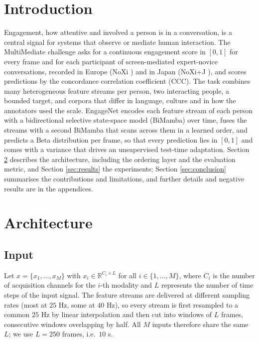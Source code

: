 \documentclass[10pt,a4paper,twocolumn]{article}
\newcommand{\R}{\mathbb{R}}
\begin{document}
	\section{Introduction}
	\label{sec:intro}
	Engagement, how attentive and involved a person is in a conversation, is a central signal for systems that observe or mediate human interaction. The MultiMediate challenge \cite{withanage25} asks for a continuous engagement score in $[0,1]$ for every frame and for each participant of screen-mediated expert-novice conversations, recorded in Europe (NoXi \cite{cafaro2017noxi}) and in Japan (NoXi+J \cite{funk2024noxij}), and scores predictions by the concordance correlation coefficient (CCC). The task combines many heterogeneous feature streams per person, two interacting people, a bounded target, and corpora that differ in language, culture and in how the annotators used the scale. EngageNet encodes each feature stream of each person with a bidirectional selective state-space model (BiMamba) \cite{ziyu2025} over time, fuses the streams with a second BiMamba that scans across them in a learned order, and predicts a Beta distribution per frame, so that every prediction lies in $[0,1]$ and comes with a variance that drives an unsupervised test-time adaptation. Section \ref{sec:architecture} describes the architecture, including the ordering layer and the evaluation metric, and Section \ref{sec:results} the experiments; Section \ref{sec:conclusion} summarises the contributions and limitations, and further details and negative results are in the appendices.

	\section{Architecture}
	\label{sec:architecture}
	\subsection{Input}
	Let $x=\{x_{1},\dots,x_{M}\}$ with $x_{i}\in\R^{C_{i}\times L}$ for all $i\in\{1,\dots,M\}$, where $C_{i}$ is the number of acquisition channels for the $i$-th modality and $L$ represents the number of time steps of the input signal. The feature streams are delivered at different sampling rates (most at $25$ Hz, some at $40$ Hz), so every stream is first resampled to a common $25$ Hz by linear interpolation and then cut into windows of $L$ frames, consecutive windows overlapping by half. All $M$ inputs therefore share the same $L$; we use $L = 250$ frames, i.e.\ $10$ s.
	
\end{document}
